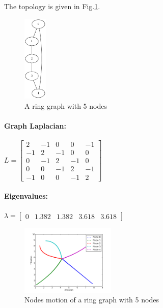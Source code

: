 \documentclass[12pt]{article}
\begin{document}
The topology is given in Fig.\ref{fig:C3}. 
\begin{figure}[htbp]
\centering
\includegraphics[width=0.1\textwidth]{./C3}
\caption{A ring graph with 5 nodes}
\label{fig:C3}
\end{figure}

\paragraph{\textbf{Graph Laplacian:}}

$
L = 
\begin{bmatrix}
2 & -1 & 0 & 0 & -1 \\
-1 & 2 & -1 & 0 & 0 \\
0 & -1 & 2 & -1 & 0 \\
0 & 0 & -1 & 2 & -1 \\
-1 & 0 & 0 & -1 & 2 
\end{bmatrix}
$

\paragraph{\textbf{Eigenvalues:}}

$
\lambda = 
\begin{bmatrix}
0 & 1.382 & 1.382 & 3.618 & 3.618
\end{bmatrix}
$

\begin{figure}[htbp]
\centering
\includegraphics[width=0.4\textwidth]{./C3_mo}
\caption{Nodes motion of a ring graph with 5 nodes}
\label{fig:C3_mo}
\end{figure}
\end{document}
